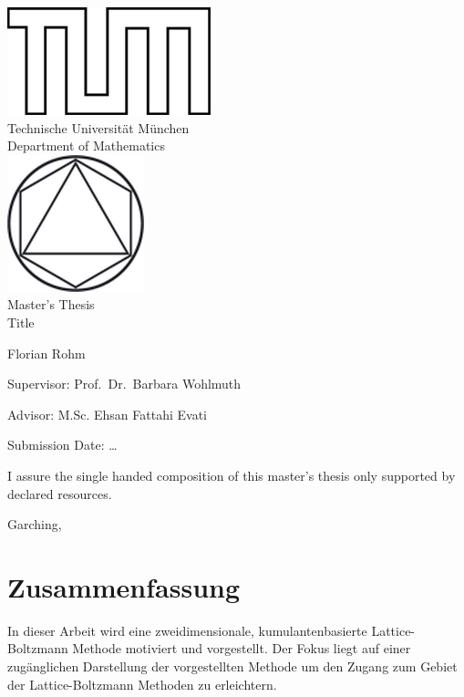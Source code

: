 \documentclass[12pt,a4paper,twoside]{article}
\begin{document}
\pagestyle{empty}
\begin{titlepage}
\begin{center}
\includegraphics{TUMlschwarz.png}\\[3mm]
\sf
{\Large
  Technische Universit\"at M\"unchen\\[5mm]
  Department of Mathematics\\[8mm]
}
\normalsize
\includegraphics{TUMlMschwarz.png}\\[15mm]

Master's Thesis\\[15mm]

{\Huge
  Title
}
\bigskip

\normalsize

Florian Rohm
\end{center}
\vspace*{75mm}

Supervisor: Prof.\ Dr.\ Barbara Wohlmuth

\medskip

Advisor: M.Sc. Ehsan Fattahi Evati
\medskip

Submission Date: \ldots

\end{titlepage}

\vspace*{150mm}

I assure the single handed composition of this master's thesis only supported by declared resources.
\bigskip

Garching,
\newpage
\section*{Zusammenfassung}
In dieser Arbeit wird eine zweidimensionale, kumulantenbasierte Lattice-Boltzmann Methode motiviert und vorgestellt.
Der Fokus liegt auf einer zug\"anglichen Darstellung der vorgestellten Methode um den Zugang zum Gebiet der Lattice-Boltzmann Methoden zu erleichtern.
\end{document}
